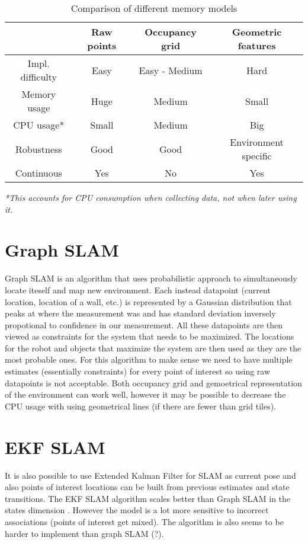 \documentclass[12pt, a4paper, onecolumn]{article}
\begin{document}
\begin{table}[h!]
  \begin{center}
    \begin{tabular}[c]{|c | c c c|}
      \hline
       & Raw points & Occupancy grid & Geometric features \\
      \hline
      Impl. difficulty & Easy & Easy - Medium & Hard \\
      \hline
      Memory usage & Huge & Medium & Small \\
      \hline
      CPU usage* & Small & Medium & Big \\
      \hline
      Robustness & Good & Good & Environment specific \\
      \hline
      Continuous & Yes & No & Yes \\
      \hline
    \end{tabular}
  \end{center}
  \caption{Comparison of different memory models}
  \label{tab:memory_models}
\end{table}
\textit{*This accounts for CPU consumption when collecting data, not when later using it.}

\section{Graph SLAM}
Graph SLAM is an algorithm that uses probabilistic approach to simultaneously locate iteself and map new environment.
Each instead datapoint (current location, location of a wall, etc.) is represented by a Gaussian distribution that peaks at where the measurement was
and has standard deviation inversely propotional to confidence in our measurement.
All these datapoints are then viewed as constraints for the system that needs to be maximized.
The locations for the robot and objects that maximize the system are then used as they are the most probable ones.
For this algorithm to make sense we need to have multiple estimates (essentially constraints) for every point of interest so using raw datapoints is not acceptable.
Both occupancy grid and gemoetrical representation of the environment can work well, however it may be possible to decrease the CPU usage with using geometrical lines (if there are fewer than grid tiles).

\section{EKF SLAM}
It is also possible to use Extended Kalman Filter for SLAM as current pose and also points of interest locations can be built from previous estimates and state transitions.
The EKF SLAM algorithm scales better than Graph SLAM in the states dimension \cite{EKFSLAM}. 
However the model is a lot more sensitive to incorrect associations (points of interest get mixed).
The algorithm is also seems to be harder to implement than graph SLAM (?). 
\end{document}
